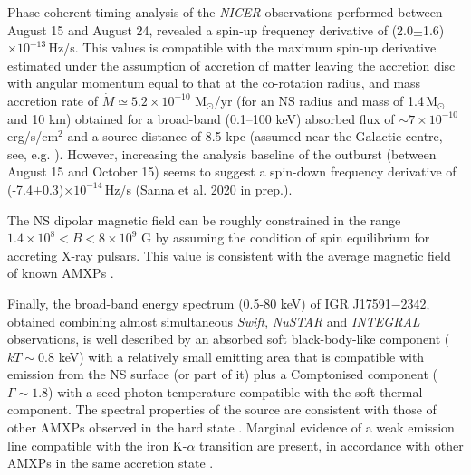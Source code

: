 \documentclass[graybox]{svmult}
\def \inte {{\em INTEGRAL\xspace}}
\def \swift {{\em Swift\xspace}}
\def \igrsev{{IGR J17591$-$2342\xspace}}
\def \nustar{{\em NuSTAR\xspace}}
\def \nicer{{\em NICER\xspace}}
\begin{document}
Phase-coherent timing analysis of the \nicer{} observations performed between August 15 and August 24, revealed a spin-up frequency derivative of (2.0$\pm$1.6)$\times 10^{-13}$\,Hz/s. 
This values is compatible with the maximum spin-up derivative estimated under the assumption of accretion of matter leaving the accretion disc with angular momentum equal to that at the co-rotation radius, and mass accretion rate of $\dot{M}\simeq5.2\times10^{-10}$ M$_{\odot}$/yr (for an NS radius and mass of 1.4\,M$_{\odot}$ and 10 km) obtained for a broad-band (0.1--100 keV) absorbed flux of $\sim7\times10^{-10}$ erg/s/cm$^2$ and a source distance of 8.5 kpc (assumed near the Galactic centre, see, e.g. \cite{Kerr1986}).
However, increasing the analysis baseline of the outburst (between August 15 and October 15) seems to suggest a spin-down frequency derivative of (-7.4$\pm$0.3)$\times 10^{-14}$\,Hz/s (Sanna et al. 2020 in prep.). 


The NS dipolar magnetic field can be roughly constrained in the range $1.4\times10^8<B<8\times 10^{9}$ G by assuming the condition of spin equilibrium for accreting X-ray pulsars. This value is consistent with the average magnetic field of known AMXPs \cite{Mukherjee2015}. 


Finally, the broad-band energy spectrum (0.5-80 keV) of \igrsev{}, obtained combining almost simultaneous \swift{}, \nustar{} and \inte{} observations, is well described by an absorbed soft black-body-like component ($kT\sim 0.8$ keV) with a relatively small emitting area that is compatible with emission from the NS surface (or part of it) plus a Comptonised component ($\Gamma \sim 1.8$) with a seed photon temperature compatible with the soft thermal component. The spectral properties of the source are consistent with those of other AMXPs observed in the hard state \cite{Falanga2005a,Gierlinski2005,Papitto2009, Papitto2013a,Sanna2017d,Sanna2017b}. Marginal evidence of a weak emission line compatible with the iron K-$\alpha$ transition are present, in accordance with other AMXPs in the same accretion state \cite{Sanna2017d,Sanna2017b}.


\section{}



\end{document}
